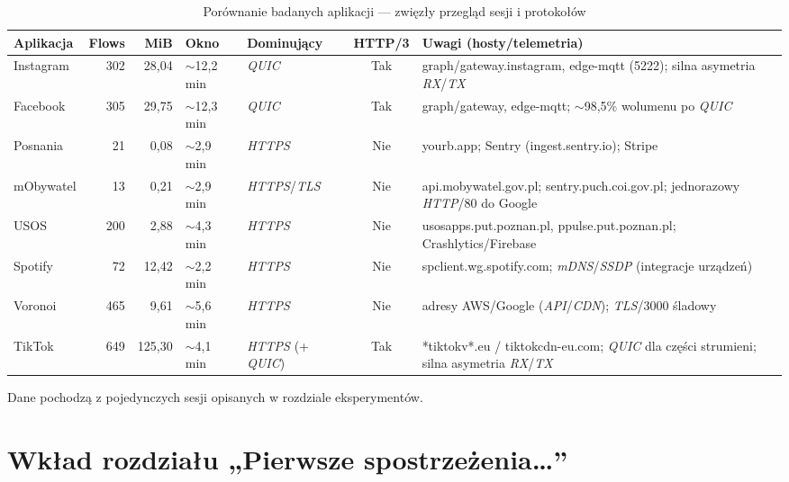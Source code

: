 \begin{table}[H]
\centering
\caption{Porównanie badanych aplikacji — zwięzły przegląd sesji i protokołów}
\label{tab:apps-overview}
\small
\setlength{\tabcolsep}{6pt}
\renewcommand{\arraystretch}{1.15}
\begin{tabularx}{\textwidth}{@{} l r r l l c X @{}}
\toprule
\textbf{Aplikacja} & \textbf{Flows} & \textbf{MiB} & \textbf{Okno} & \textbf{Dominujący} & \textbf{HTTP/3} & \textbf{Uwagi (hosty/telemetria)} \\
\midrule
Instagram & 302 & 28{,}04 & \(\sim\)12{,}2 min & \emph{QUIC}       & Tak & graph/gateway.instagram, edge-mqtt (5222); silna asymetria \emph{RX}/\emph{TX} \\
Facebook  & 305 & 29{,}75 & \(\sim\)12{,}3 min & \emph{QUIC}       & Tak & graph/gateway, edge-mqtt; \(\sim\)98{,}5\% wolumenu po \emph{QUIC} \\
Posnania  & 21  & 0{,}08  & \(\sim\)2{,}9  min & \emph{HTTPS}      & Nie & yourb.app; Sentry (ingest.sentry.io); Stripe \\
mObywatel & 13  & 0{,}21  & \(\sim\)2{,}9  min & \emph{HTTPS}/\emph{TLS}  & Nie & api.mobywatel.gov.pl; sentry.puch.coi.gov.pl; jednorazowy \emph{HTTP}/80 do Google \\
USOS      & 200 & 2{,}88  & \(\sim\)4{,}3  min & \emph{HTTPS}      & Nie & usosapps.put.poznan.pl, ppulse.put.poznan.pl; Crashlytics/Firebase \\
Spotify   & 72  & 12{,}42 & \(\sim\)2{,}2  min & \emph{HTTPS}      & Nie & spclient.wg.spotify.com; \emph{mDNS}/\emph{SSDP} (integracje urządzeń) \\
Voronoi   & 465 & 9{,}61  & \(\sim\)5{,}6  min & \emph{HTTPS}      & Nie & adresy AWS/Google (\emph{API}/\emph{CDN}); \emph{TLS}/3000 śladowy \\
TikTok    & 649 & 125{,}30& \(\sim\)4{,}1  min & \emph{HTTPS} (+ \emph{QUIC}) & Tak & *tiktokv*.eu / tiktokcdn-eu.com; \emph{QUIC} dla części strumieni; silna asymetria \emph{RX}/\emph{TX} \\
\bottomrule
\end{tabularx}
\vspace{0.25em}

{\footnotesize Dane pochodzą z pojedynczych sesji opisanych w rozdziale eksperymentów.}
\end{table}

\section{Wkład rozdziału „Pierwsze spostrzeżenia…”}

